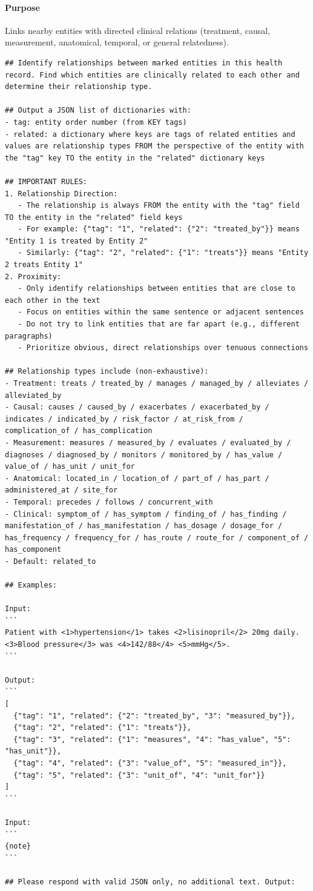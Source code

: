 \paragraph{Purpose} Links nearby entities with directed clinical relations (treatment, causal, measurement, anatomical, temporal, or general relatedness).
\begin{lstlisting}
## Identify relationships between marked entities in this health record. Find which entities are clinically related to each other and determine their relationship type.

## Output a JSON list of dictionaries with:
- tag: entity order number (from KEY tags)
- related: a dictionary where keys are tags of related entities and values are relationship types FROM the perspective of the entity with the "tag" key TO the entity in the "related" dictionary keys

## IMPORTANT RULES:
1. Relationship Direction:
   - The relationship is always FROM the entity with the "tag" field TO the entity in the "related" field keys
   - For example: {"tag": "1", "related": {"2": "treated_by"}} means "Entity 1 is treated by Entity 2"
   - Similarly: {"tag": "2", "related": {"1": "treats"}} means "Entity 2 treats Entity 1"
2. Proximity:
   - Only identify relationships between entities that are close to each other in the text
   - Focus on entities within the same sentence or adjacent sentences
   - Do not try to link entities that are far apart (e.g., different paragraphs)
   - Prioritize obvious, direct relationships over tenuous connections

## Relationship types include (non-exhaustive):
- Treatment: treats / treated_by / manages / managed_by / alleviates / alleviated_by
- Causal: causes / caused_by / exacerbates / exacerbated_by / indicates / indicated_by / risk_factor / at_risk_from / complication_of / has_complication
- Measurement: measures / measured_by / evaluates / evaluated_by / diagnoses / diagnosed_by / monitors / monitored_by / has_value / value_of / has_unit / unit_for
- Anatomical: located_in / location_of / part_of / has_part / administered_at / site_for
- Temporal: precedes / follows / concurrent_with
- Clinical: symptom_of / has_symptom / finding_of / has_finding / manifestation_of / has_manifestation / has_dosage / dosage_for / has_frequency / frequency_for / has_route / route_for / component_of / has_component
- Default: related_to

## Examples:

Input:
```
Patient with <1>hypertension</1> takes <2>lisinopril</2> 20mg daily. <3>Blood pressure</3> was <4>142/88</4> <5>mmHg</5>.
```

Output:
```
[
  {"tag": "1", "related": {"2": "treated_by", "3": "measured_by"}},
  {"tag": "2", "related": {"1": "treats"}},
  {"tag": "3", "related": {"1": "measures", "4": "has_value", "5": "has_unit"}},
  {"tag": "4", "related": {"3": "value_of", "5": "measured_in"}},
  {"tag": "5", "related": {"3": "unit_of", "4": "unit_for"}}
]
```

Input:
```
{note}
```

## Please respond with valid JSON only, no additional text. Output:
\end{lstlisting}


